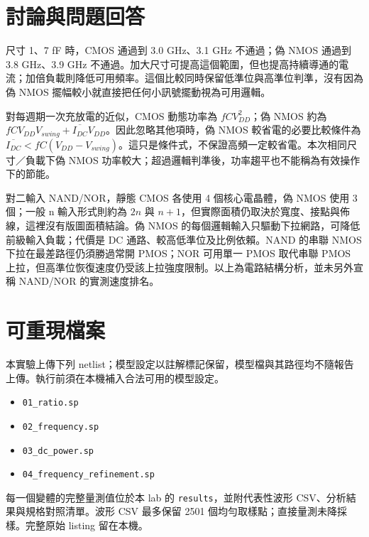 \section{討論與問題回答}
尺寸 1、7 fF 時，CMOS 通過到 3.0 GHz、3.1 GHz 不通過；偽 NMOS 通過到 3.8 GHz、3.9 GHz 不通過。加大尺寸可提高這個範圍，但也提高持續導通的電流；加倍負載則降低可用頻率。這個比較同時保留低準位與高準位判準，沒有因為偽 NMOS 擺幅較小就直接把任何小訊號擺動視為可用邏輯。

對每週期一次充放電的近似，CMOS 動態功率為 $fCV_{DD}^{2}$；偽 NMOS 約為 $fCV_{DD}V_{swing}+\overline{I_{DC}}V_{DD}$。因此忽略其他項時，偽 NMOS 較省電的必要比較條件為 $\overline{I_{DC}}<fC(V_{DD}-V_{swing})$。這只是條件式，不保證高頻一定較省電。本次相同尺寸／負載下偽 NMOS 功率較大；超過邏輯判準後，功率趨平也不能稱為有效操作下的節能。

對二輸入 NAND/NOR，靜態 CMOS 各使用 4 個核心電晶體，偽 NMOS 使用 3 個；一般 n 輸入形式則約為 $2n$ 與 $n+1$，但實際面積仍取決於寬度、接點與佈線，這裡沒有版圖面積結論。偽 NMOS 的每個邏輯輸入只驅動下拉網路，可降低前級輸入負載；代價是 DC 通路、較高低準位及比例依賴。NAND 的串聯 NMOS 下拉在最差路徑仍須勝過常開 PMOS；NOR 可用單一 PMOS 取代串聯 PMOS 上拉，但高準位恢復速度仍受該上拉強度限制。以上為電路結構分析，並未另外宣稱 NAND/NOR 的實測速度排名。

\section{可重現檔案}
本實驗上傳下列 netlist；模型設定以註解標記保留，模型檔與其路徑均不隨報告上傳。執行前須在本機補入合法可用的模型設定。
\begin{itemize}
\item \texttt{01\_ratio.sp}
\item \texttt{02\_frequency.sp}
\item \texttt{03\_dc\_power.sp}
\item \texttt{04\_frequency\_refinement.sp}
\end{itemize}
每一個變體的完整量測值位於本 lab 的 \texttt{results}，並附代表性波形 CSV、分析結果與規格對照清單。波形 CSV 最多保留 2501 個均勻取樣點；直接量測未降採樣。完整原始 listing 留在本機。

